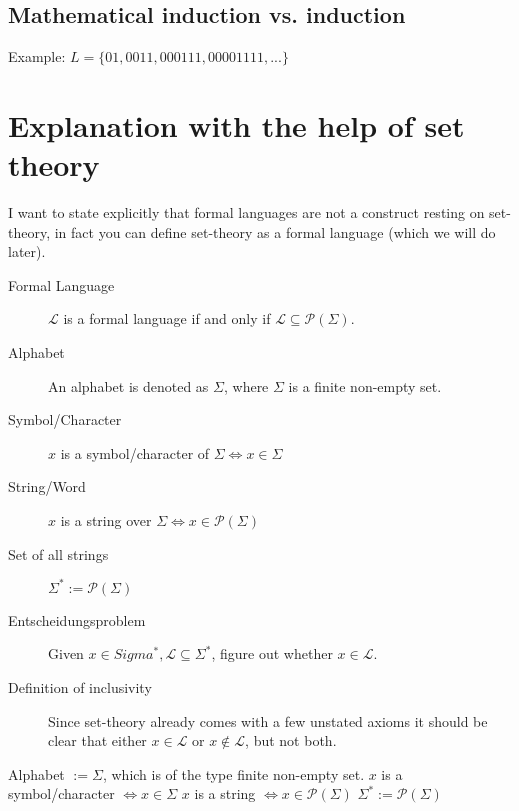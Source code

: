 \subsection{Mathematical induction vs. induction}
	
	
		Example: $L = \{01,0011,000111,00001111,...\}$


\section{Explanation with the help of set theory}
I want to state explicitly that formal languages are not a construct resting on set-theory, in fact you can define set-theory as a formal language (which we will do later).
\begin{description}
	\item[Formal Language] $\mathcal{L}$ is a formal language if and only if $\mathcal{L} \subseteq \mathcal{P}(\Sigma)$.



	\item[Alphabet] An alphabet is denoted as $\Sigma$, where $\Sigma$ is a finite non-empty set.
	\item[Symbol/Character] $x$ is a symbol/character of $\Sigma \Leftrightarrow x \in \Sigma$
	\item[String/Word] $x$ is a string over $\Sigma \Leftrightarrow x \in \mathcal{P}(\Sigma)$ 
	\item[Set of all strings] $\Sigma^* := \mathcal{P}(\Sigma)$
	\item[Entscheidungsproblem] Given $x \in Sigma^*, \mathcal{L} \subseteq \Sigma^*$, figure out whether $x \in \mathcal{L}$.
	\item[Definition of inclusivity] Since set-theory already comes with a few unstated axioms it should be clear that either $x \in \mathcal{L}$ or $x \notin \mathcal{L}$, but not both.
\end{description}
Alphabet $:= \Sigma$, which is of the type finite non-empty set.
$x$ is a symbol/character $\Leftrightarrow x \in \Sigma$ 
$x$ is a string $\Leftrightarrow x \in \mathcal{P}(\Sigma)$
$\Sigma^* := \mathcal{P}(\Sigma)$
